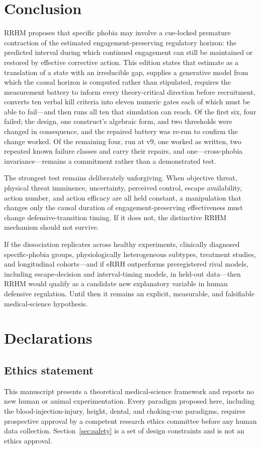 \documentclass[9pt,twocolumn]{article}
\begin{document}
\section{Conclusion}
RRHM proposes that specific phobia may involve a cue-locked premature contraction of the estimated engagement-preserving regulatory horizon: the predicted interval during which continued engagement can still be maintained or restored by effective corrective action. This edition states that estimate as a translation of a state with an irreducible gap, supplies a generative model from which the causal horizon is computed rather than stipulated, requires the measurement battery to inform every theory-critical direction before recruitment, converts ten verbal kill criteria into eleven numeric gates each of which must be able to fail---and then runs all ten that simulation can reach. Of the first six, four failed; the design, one construct's algebraic form, and two thresholds were changed in consequence, and the repaired battery was re-run to confirm the change worked. Of the remaining four, run at v9, one worked as written, two repeated known failure classes and carry their repairs, and one---cross-phobia invariance---remains a commitment rather than a demonstrated test.

The strongest test remains deliberately unforgiving. When objective threat, physical threat imminence, uncertainty, perceived control, escape availability, action number, and action efficacy are all held constant, a manipulation that changes only the causal duration of engagement-preserving effectiveness must change defensive-transition timing. If it does not, the distinctive RRHM mechanism should not survive.

If the dissociation replicates across healthy experiments, clinically diagnosed specific-phobia groups, physiologically heterogeneous subtypes, treatment studies, and longitudinal cohorts---and if eRRH outperforms preregistered rival models, including escape-decision and interval-timing models, in held-out data---then RRHM would qualify as a candidate new explanatory variable in human defensive regulation. Until then it remains an explicit, measurable, and falsifiable medical-science hypothesis.

\section*{Declarations}
\subsection*{Ethics statement}
This manuscript presents a theoretical medical-science framework and reports no new human or animal experimentation. Every paradigm proposed here, including the blood-injection-injury, height, dental, and choking-cue paradigms, requires prospective approval by a competent research ethics committee before any human data collection. Section~\ref{sec:safety} is a set of design constraints and is not an ethics approval.
\end{document}
